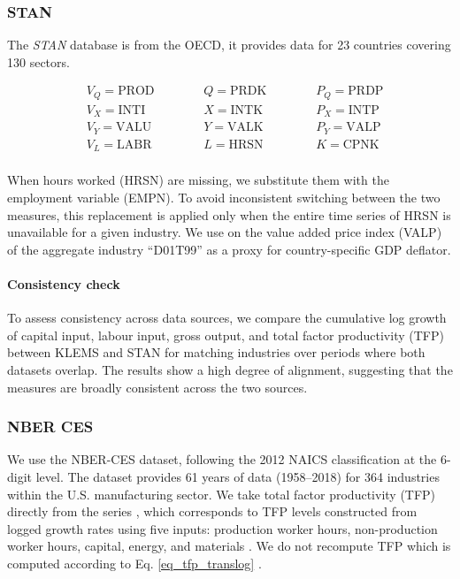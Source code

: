 \documentclass[11pt]{article}
\begin{document}
\subsubsection{STAN} The \textit{STAN} database is from the OECD, it provides data for 23 countries covering 130 sectors.

\begin{align*}
&V_Q=\text{PROD} \hspace{1cm}&
&Q=\text{PRDK} \hspace{1cm}&
&P_Q=\text{PRDP}\\
&V_X=\text{INTI} \hspace{1cm}&
&X=\text{INTK} \hspace{1cm}&
&P_X=\text{INTP}\\
&V_Y=\text{VALU} \hspace{1cm}&
&Y=\text{VALK} \hspace{1cm}&
&P_Y=\text{VALP}\\
&V_L=\text{LABR} \hspace{1cm}&
&L=\text{HRSN} \hspace{1cm}&
&K=\text{CPNK}\\
\end{align*}

When hours worked (HRSN) are missing, we substitute them with the employment variable (EMPN). To avoid inconsistent switching between the two measures, this replacement is applied only when the entire time series of HRSN is unavailable for a given industry. We use on the value added price index (VALP) of the aggregate industry “D01T99” as a proxy for country-specific GDP deflator.

\paragraph{Consistency check} To assess consistency across data sources, we compare the cumulative log growth of capital input, labour input, gross output, and total factor productivity (TFP) between KLEMS and STAN for matching industries over periods where both datasets overlap. The results show a high degree of alignment, suggesting that the measures are broadly consistent across the two sources.


\subsubsection{NBER CES} 

We use the NBER-CES dataset, following the 2012 NAICS classification at the 6-digit level. The dataset provides 61 years of data (1958–2018) for 364 industries within the U.S. manufacturing sector. We take total factor productivity (TFP) directly from the series , which corresponds to TFP levels constructed from logged growth rates using five inputs: production worker hours, non-production worker hours, capital, energy, and materials \citep{beckerNBERCESManufacturingIndustry2013}. We do not recompute TFP which is computed according to Eq. \eqref{eq_tfp_translog} \citep{beckerNBERCESManufacturingIndustry2013}.
\end{document}
